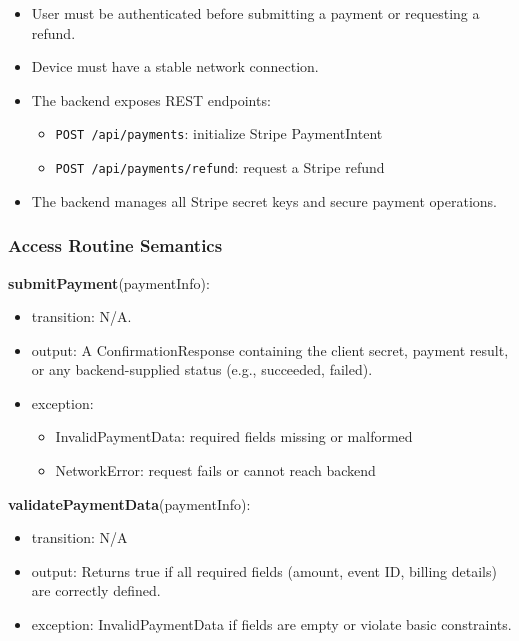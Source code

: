 \documentclass[12pt, titlepage]{article}
\begin{document}
\begin{itemize}
    \item User must be authenticated before submitting a payment or requesting a refund.
    \item Device must have a stable network connection.
    \item The backend exposes REST endpoints:
        \begin{itemize}
            \item \texttt{POST /api/payments}: initialize Stripe PaymentIntent
            \item \texttt{POST /api/payments/refund}: request a Stripe refund
        \end{itemize}
    \item The backend manages all Stripe secret keys and secure payment operations.
\end{itemize}

\subsubsection{Access Routine Semantics}

\noindent \textbf{submitPayment}(paymentInfo):

\begin{itemize}
    \item transition: N/A.
    \item output: A ConfirmationResponse containing the client secret, payment result, 
    or any backend-supplied status (e.g., succeeded, failed).
    \item exception: 
        \begin{itemize}
            \item InvalidPaymentData: required fields missing or malformed  
            \item NetworkError: request fails or cannot reach backend 
        \end{itemize}
\end{itemize}

\vspace{0.2cm}

\noindent \textbf{validatePaymentData}(paymentInfo):

\begin{itemize}
    \item transition: N/A
    \item output: Returns true if all required fields (amount, event ID, billing details) 
    are correctly defined.
    \item exception: InvalidPaymentData if fields are empty or violate basic constraints.
\end{itemize}
\end{document}
